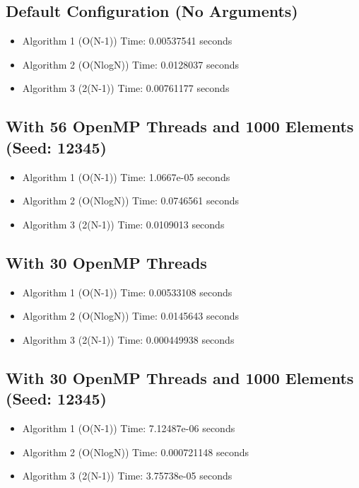 \documentclass[11pt, twocolumn]{article}
\begin{document}
\subsection*{Default Configuration (No Arguments)}

\begin{itemize}
    \item Algorithm 1 (O(N-1)) Time: 0.00537541 seconds
    \item Algorithm 2 (O(NlogN)) Time: 0.0128037 seconds
    \item Algorithm 3 (2(N-1)) Time: 0.00761177 seconds
\end{itemize}

\subsection*{With 56 OpenMP Threads and 1000 Elements (Seed: 12345)}

\begin{itemize}
    \item Algorithm 1 (O(N-1)) Time: 1.0667e-05 seconds
    \item Algorithm 2 (O(NlogN)) Time: 0.0746561 seconds
    \item Algorithm 3 (2(N-1)) Time: 0.0109013 seconds
\end{itemize}

\subsection*{With 30 OpenMP Threads}

\begin{itemize}
    \item Algorithm 1 (O(N-1)) Time: 0.00533108 seconds
    \item Algorithm 2 (O(NlogN)) Time: 0.0145643 seconds
    \item Algorithm 3 (2(N-1)) Time: 0.000449938 seconds
\end{itemize}

\subsection*{With 30 OpenMP Threads and 1000 Elements (Seed: 12345)}

\begin{itemize}
    \item Algorithm 1 (O(N-1)) Time: 7.12487e-06 seconds
    \item Algorithm 2 (O(NlogN)) Time: 0.000721148 seconds
    \item Algorithm 3 (2(N-1)) Time: 3.75738e-05 seconds
\end{itemize}
\end{document}
